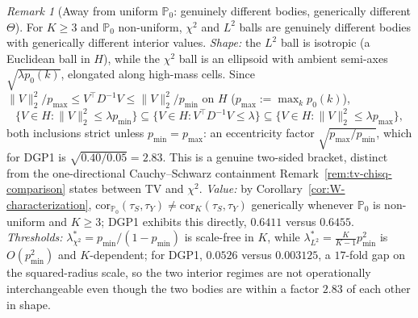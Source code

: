 \documentclass[11pt]{article}
\theoremstyle{plain}
\theoremstyle{definition}
\theoremstyle{remark}
\newtheorem{remark}[theorem]{Remark}
\newcommand{\PP}{\mathbb{P}}
\newcommand{\Corr}{\mathrm{cor}}
\begin{document}
\begin{remark}[Away from uniform $\PP_0$: genuinely different bodies, generically
different $\Theta$]\label{rem:chisq-l2-shape}
For $K\ge3$ and $\PP_0$ non-uniform, $\chi^2$ and $L^2$ balls are genuinely different
bodies with generically different interior values. \emph{Shape:} the $L^2$ ball is
isotropic (a Euclidean ball in $H$), while the $\chi^2$ ball is an ellipsoid with
ambient semi-axes $\sqrt{\lambda p_0(k)}$, elongated along high-mass cells. Since
$\|V\|_2^2/p_{\max}\le V^\top D^{-1}V\le\|V\|_2^2/p_{\min}$ on $H$
($p_{\max}:=\max_kp_0(k)$),
\begin{equation}\label{eq:sandwich-l2-chisq}
    \{V\in H:\|V\|_2^2\le\lambda p_{\min}\}
    \subseteq\{V\in H:V^\top D^{-1}V\le\lambda\}
    \subseteq\{V\in H:\|V\|_2^2\le\lambda p_{\max}\},
\end{equation}
both inclusions strict unless $p_{\min}=p_{\max}$: an eccentricity factor
$\sqrt{p_{\max}/p_{\min}}$, which for DGP1 is $\sqrt{0.40/0.05}=2.83$. This is a
genuine two-sided bracket, distinct from the one-directional Cauchy--Schwarz
containment Remark~\ref{rem:tv-chisq-comparison} states between TV and $\chi^2$.
\emph{Value:} by Corollary~\ref{cor:W-characterization},
$\Corr_{\PP_0}(\tau_S,\tau_Y)\ne\Corr_K(\tau_S,\tau_Y)$ generically whenever $\PP_0$ is
non-uniform and $K\ge3$; DGP1 exhibits this directly, $0.6411$ versus $0.6455$.
\emph{Thresholds:} $\lambda^*_{\chi^2}=p_{\min}/(1-p_{\min})$ is scale-free in $K$,
while $\lambda^*_{L^2}=\frac K{K-1}p_{\min}^2$ is $O(p_{\min}^2)$ and $K$-dependent;
for DGP1, $0.0526$ versus $0.003125$, a $17$-fold gap on the squared-radius scale, so
the two interior regimes are not operationally interchangeable even though the two
bodies are within a factor $2.83$ of each other in shape.
\end{remark}
\end{document}
